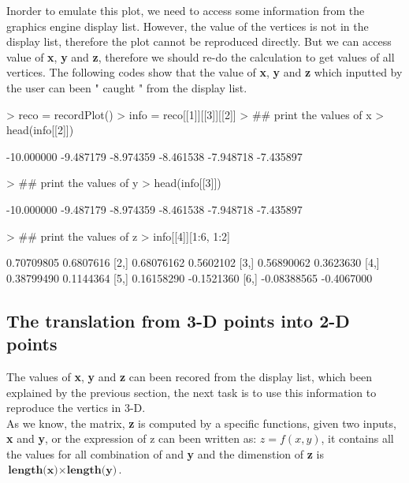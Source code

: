\documentclass[paper=a4, fontsize=11pt]{report}
\begin{document}
Inorder to emulate this plot, we need to access some information from the graphics engine display list. However, the value of the vertices is not in the display list, therefore the plot cannot be reproduced directly. But we can access value of \textbf{x}, \textbf{y} and \textbf{z}, therefore we should re-do the calculation to get values of all vertices. The following codes show that the value of \textbf{x}, \textbf{y} and \textbf{z} which inputted by the user can been " caught " from the display list.
\begin{Schunk}
\begin{Sinput}
> reco = recordPlot()
> info = reco[[1]][[3]][[2]]
> ## print the values of x
> head(info[[2]])
\end{Sinput}
\begin{Soutput}
[1] -10.000000  -9.487179  -8.974359  -8.461538  -7.948718  -7.435897
\end{Soutput}
\begin{Sinput}
> ## print the values of y
> head(info[[3]])
\end{Sinput}
\begin{Soutput}
[1] -10.000000  -9.487179  -8.974359  -8.461538  -7.948718  -7.435897
\end{Soutput}
\begin{Sinput}
> ## print the values of z
> info[[4]][1:6, 1:2]
\end{Sinput}
\begin{Soutput}
            [,1]       [,2]
[1,]  0.70709805  0.6807616
[2,]  0.68076162  0.5602102
[3,]  0.56890062  0.3623630
[4,]  0.38799490  0.1144364
[5,]  0.16158290 -0.1521360
[6,] -0.08388565 -0.4067000
\end{Soutput}
\end{Schunk}
\subsection{The translation from 3-D points into 2-D points}
The values of \textbf{x}, \textbf{y} and \textbf{z} can been recored from the display list, which been explained by the previous section, the next task is to use this information to reproduce the vertics in 3-D.\\

As we know, the matrix, \textbf{z} is computed by a specific functions, given two inputs, \textbf{x} and \textbf{y}, or the expression of z can been written as: $z = f(x,y)$, it contains all the values for all combination of  and \textbf{y} and the dimenstion of \textbf{z} is $ \textbf{length(x)} \times \textbf{length(y)}$.\\
\end{document}
